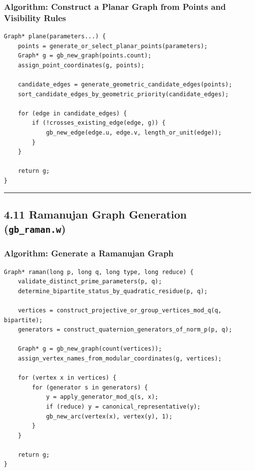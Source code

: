 \documentclass[11pt]{article}
\begin{document}
\subsubsection{Algorithm: Construct a Planar Graph from Points and Visibility Rules}\label{algorithm-construct-a-planar-graph-from-points-and-visibility-rules}

\begin{verbatim}
Graph* plane(parameters...) {
    points = generate_or_select_planar_points(parameters);
    Graph* g = gb_new_graph(points.count);
    assign_point_coordinates(g, points);

    candidate_edges = generate_geometric_candidate_edges(points);
    sort_candidate_edges_by_geometric_priority(candidate_edges);

    for (edge in candidate_edges) {
        if (!crosses_existing_edge(edge, g)) {
            gb_new_edge(edge.u, edge.v, length_or_unit(edge));
        }
    }

    return g;
}
\end{verbatim}

\begin{center}\rule{0.5\linewidth}{0.5pt}\end{center}

\subsection{\texorpdfstring{4.11 Ramanujan Graph Generation (\texttt{gb\_raman.w})}{4.11 Ramanujan Graph Generation (gb\_raman.w)}}\label{ramanujan-graph-generation-gb_raman.w}

\subsubsection{Algorithm: Generate a Ramanujan Graph}\label{algorithm-generate-a-ramanujan-graph}

\begin{verbatim}
Graph* raman(long p, long q, long type, long reduce) {
    validate_distinct_prime_parameters(p, q);
    determine_bipartite_status_by_quadratic_residue(p, q);

    vertices = construct_projective_or_group_vertices_mod_q(q, bipartite);
    generators = construct_quaternion_generators_of_norm_p(p, q);

    Graph* g = gb_new_graph(count(vertices));
    assign_vertex_names_from_modular_coordinates(g, vertices);

    for (vertex x in vertices) {
        for (generator s in generators) {
            y = apply_generator_mod_q(s, x);
            if (reduce) y = canonical_representative(y);
            gb_new_arc(vertex(x), vertex(y), 1);
        }
    }

    return g;
}
\end{verbatim}
\end{document}
